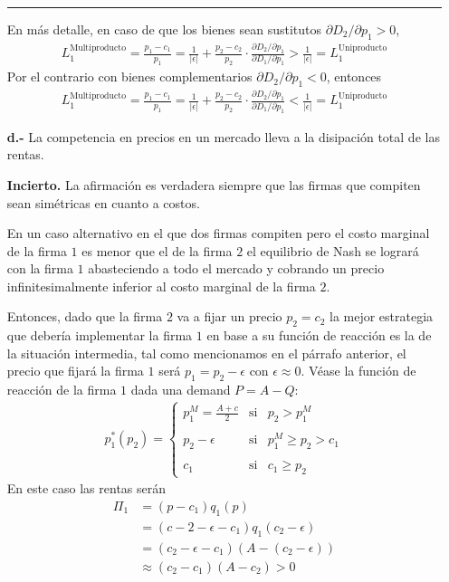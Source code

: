 \begin{itemize}
\begin{solution}
        \rule{\linewidth}{0.4pt}
        En más detalle, en caso de que los bienes sean sustitutos $\partial D_2 / \partial p_1> 0$,
        \begin{align*}
            L_1^{\text{Multiproducto}} = \frac{p_1-c_1}{p_1} = \frac{1}{|\epsilon|} + \frac{p_2-c_2}{p_2}\cdot \frac{\partial D_2 / \partial p_1}{\partial D_1 / \partial p_1} > \frac{1}{|\epsilon|} = L_1^{\text{Uniproducto}}
        \end{align*}
        Por el contrario con bienes complementarios $\partial D_2 / \partial p_1<0$, entonces
        \begin{align*}
            L_1^{\text{Multiproducto}} = \frac{p_1-c_1}{p_1} = \frac{1}{|\epsilon|} + \frac{p_2-c_2}{p_2}\cdot \frac{\partial D_2 / \partial p_1}{\partial D_1 / \partial p_1} < \frac{1}{|\epsilon|} = L_1^{\text{Uniproducto}}
        \end{align*}
    \end{solution}
    \item [\textbf{d.-}] La competencia en precios en un mercado lleva a la disipación total de las rentas.
    \begin{solution}
        \textbf{Incierto.} La afirmación es verdadera siempre que las firmas que compiten sean simétricas en cuanto a costos.

        En un caso alternativo en el que dos firmas compiten pero el costo marginal de la firma $1$ es menor que el de la firma $2$ el equilibrio de Nash se logrará con la firma $1$ abasteciendo a todo el mercado y cobrando un precio infinitesimalmente inferior al costo marginal de la firma $2$.

        Entonces, dado que la firma $2$ va a fijar un precio $p_2 = c_2$ la mejor estrategia que debería implementar la firma $1$ en base a su función de reacción es la de la situación intermedia, tal como mencionamos en el párrafo anterior, el precio que fijará la firma $1$ será $p_1 = p_2 - \epsilon$ con $\epsilon \approx 0$. Véase la función de reacción de la firma $1$ dada una demand  $P = A-Q$:
        \begin{align*}
            p^*_1(p_2)= \left\{ \begin{array}{lcc} p_1^M = \frac{A+c}{2} & \text{si} &  p_2> p_1^M \\ \\ p_2-\epsilon & \text{si} & p_1^M \geq p_2>c_1 \\ \\ c_1 & \text{si} & c_1 \geq p_2 \end{array} \right.
        \end{align*}
        En este caso las rentas serán
        \begin{align*}
            \Pi_1 &= (p-c_1)q_1(p) \\
            & = (c-2-\epsilon -c_1)q_1(c_2-\epsilon) \\
            &=(c_2-\epsilon -c_1)(A-(c_2-\epsilon)) \\
            & \approx (c_2-c_1)(A-c_2) > 0 
        \end{align*}
    \end{solution}
\end{itemize}